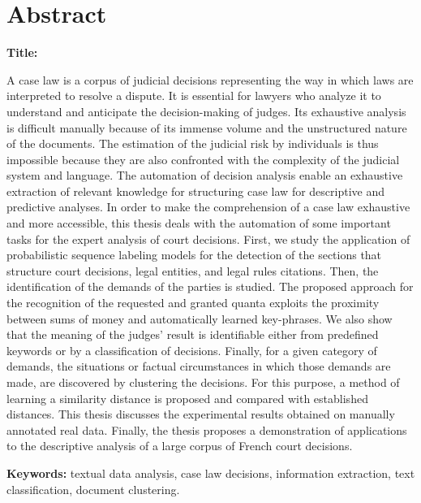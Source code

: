 \chapter*{Abstract}
\textbf{Title:} \textsc{\titleen}

A case law is a corpus of judicial decisions representing the way in which laws are interpreted to resolve a dispute. It is essential for lawyers who analyze it to understand and anticipate the decision-making of judges. Its exhaustive analysis is difficult manually because of its immense volume and the unstructured nature of the documents. The estimation of the judicial risk by individuals is thus impossible because they are also confronted with the complexity of the judicial system and language. The automation of decision analysis enable an exhaustive extraction of relevant knowledge for structuring case law for descriptive and predictive analyses. In order to make the comprehension of a case law exhaustive and more accessible, this thesis deals with the automation of some important tasks for the expert analysis of court decisions. First, we study the application of probabilistic sequence labeling models for the detection of the sections that structure court decisions, legal entities, and legal rules citations. Then, the identification of the demands of the parties is studied. The proposed approach for the recognition of the requested and granted quanta exploits the proximity between sums of money and automatically learned key-phrases. We also show that the meaning of the judges' result is identifiable either from predefined keywords or by a classification of decisions. Finally, for a given category of demands, the situations or factual circumstances in which those demands are made, are discovered by clustering the decisions. For this purpose, a method of learning a similarity distance is proposed and compared with established distances. This thesis discusses the experimental results obtained on manually annotated real data. Finally, the thesis proposes a demonstration of applications to the descriptive analysis of a large corpus of French court decisions.

\textbf{Keywords:} textual data analysis, case law decisions, information extraction, text classification, document clustering.

